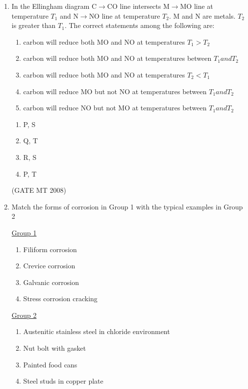 \documentclass[journal, 11pt, onecolumn]{IEEEtran}
\theoremstyle{remark}
\begin{document}
\begin{enumerate}
\item In the Ellingham diagram C$\rightarrow$CO line intersects M$\rightarrow$MO line at temperature $T_1$ and N$\rightarrow$NO line at temperature $T_2$. M and N are metals. $T_2$ is greater than $T_1$. The correct statements among the following are:
\begin{enumerate}[label=(\MakeUppercase{\alph*}), start= 16]
\item carbon will reduce both MO and NO at temperatures $T_1 > T_2$
\item carbon will reduce both MO and NO at temperatures between $T_1 and T_2$
\item carbon will reduce both MO and NO at temperatures $T_2 < T_1$
\item carbon will reduce MO but not NO at temperatures between $T_1 and T_2$
\item carbon will reduce NO but not MO at temperatures between $T_1 and T_2$
\end{enumerate}

\begin{multicols}{2}
\begin{enumerate} 
\item P, S
\item Q, T
\item R, S
\item P, T
\end{enumerate}
\end{multicols}
\hfill(GATE MT 2008)

\item Match the forms of corrosion in Group 1 with the typical examples in Group 2
\begin{multicols}{2}
\underline{Group 1}
\begin{enumerate}[label=(\Alph*), start=16]
\item Filiform corrosion  
\item Crevice corrosion
\item Galvanic corrosion
\item Stress corrosion cracking 
\end{enumerate}

\underline{Group 2}
\begin{enumerate}[label=(\arabic*), start=1]
\item Austenitic stainless steel in chloride environment
\item Nut bolt with gasket
\item Painted food cans
\item Steel studs in copper plate
\end{enumerate}
\end{multicols}


\end{enumerate}
\end{document}
